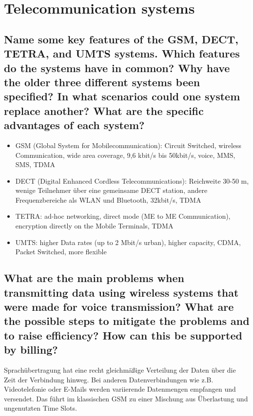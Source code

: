 \section{Telecommunication systems}

\subsection{Name some key features of the GSM, DECT, TETRA, and UMTS systems. Which features do the systems have in common? Why have the older three different systems been specified? In what scenarios could one system replace another? What are the specific advantages of each system?}
\begin{itemize}

\item GSM (Global System for Mobilecommunication): Circuit Switched, wireless Communication, wide area coverage, 9,6 kbit/s bis 50kbit/s, voice, MMS, SMS, TDMA

\item DECT (Digital Enhanced Cordless Telecommunications): Reichweite 30-50 m, wenige Teilnehmer über eine gemeinsame DECT station, andere Frequenzbereiche als WLAN und Bluetooth, 32kbit/s, TDMA

\item TETRA: ad-hoc networking, direct mode (ME to ME Communication), encryption directly on the Mobile Terminals, TDMA

\item UMTS: higher Data rates (up to 2 Mbit/s urban), higher capacity, CDMA, Packet Switched, more flexible

\end{itemize}



\subsection{What are the main problems when transmitting data using wireless systems that were made for voice transmission? What are the possible steps to mitigate the problems and to raise efficiency? How can this be supported by billing?}

Sprachübertragung hat eine recht gleichmäßige Verteilung der Daten über die Zeit der Verbindung hinweg. Bei anderen Datenverbindungen wie z.B. Videotelefonie oder E-Mails werden variierende Datenmengen empfangen und versendet. Das führt im klassischen GSM zu einer Mischung aus Überlastung und ungenutzten Time Slots.

